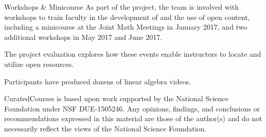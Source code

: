 \begin{sectionblock}{Workshops \& Minicourse}
  As part of the project, the team is involved with workshops to train
  faculty in the development of and the use of open content, including
  a minicourse at the Joint Math Meetings in January 2017, and two
  additional workshops in May 2017 and June 2017.

  \vspace{1ex}
  The project evaluation explores how these events enable instructors
  to locate and utilize open resources.

  \vspace{1ex}Participants have produced
  dozens of linear algebra videos.
\end{sectionblock}


\scriptsize\color{gray} CuratedCourses is based upon work supported
  by the National Science Foundation under NSF DUE-1505246.  Any
  opinions, findings, and conclusions or recommendations expressed in
  this material are those of the author(s) and do not necessarily
  reflect the views of the National Science Foundation.
